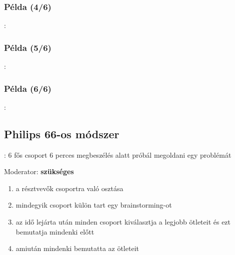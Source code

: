\documentclass{beamer}
\begin{document}
\subsubsection*{Példa (4/6)}
\begin{frame}{\subsecname : \subsubsecname}
    
\end{frame}

\subsubsection*{Példa (5/6)}
\begin{frame}{\subsecname : \subsubsecname}
    
\end{frame}

\subsubsection*{Példa (6/6)}
\begin{frame}{\subsecname : \subsubsecname}
    
\end{frame}

\subsection{Philips 66-os módszer}
\begin{frame}{\secname : \subsecname}
6 fős csoport 6 perces megbeszélés alatt próbál megoldani egy problémát

Moderator: \textbf{szükséges}

\begin{enumerate}
    \item a résztvevők csoportra való osztása
    \item mindegyik csoport külön tart egy brainstorming-ot
    \item az idő lejárta után minden csoport kiválasztja a legjobb ötleteit és ezt bemutatja mindenki előtt
    \item amiután mindenki bemutatta az ötleteit
\end{enumerate}
\end{frame}
\end{document}
